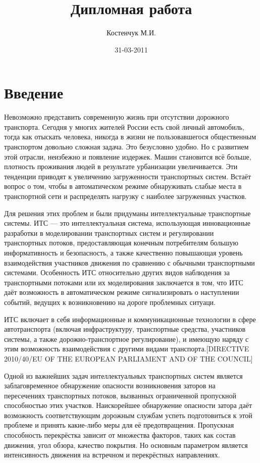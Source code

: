 \documentclass[a4paper,14pt]{article}
\title{Дипломная работа}
\author{Костенчук М.И.}
\date{31-03-2011}
\begin{document}
\maketitle

\tableofcontents
\newpage

\section{Введение}

Невозможно представить современную жизнь при отсутствии дорожного транспорта. Сегодня у многих жителей России есть свой личный автомобиль, тогда как отыскать человека, никогда в жизни не пользовавшегося общественным транспортом довольно сложная задача. Это безусловно удобно. Но с развитием этой отрасли, неизбежно и появление издержек. Машин становится всё больше, плотность проживания людей в результате урбанизации увеличивается. Эти тенденции приводят к увеличению загруженности транспортных систем. Встаёт вопрос о том, чтобы в автоматическом режиме обнаруживать слабые места в транспортной сети и распределять нагрузку с наиболее загруженных участков.

Для решения этих проблем и были придуманы интеллектуальные транспортные системы. ИТС — это интеллектуальная система, использующая инновационные разработки в моделировании транспортных систем и регулировании транспортных потоков, предоставляющая конечным потребителям большую информативность и безопасность, а также качественно повышающая уровень взаимодействия участников движения по сравнению с обычными транспортными системами. Особенность ИТС относительно других видов наблюдения за транспортными потоками или их моделирования заключается в том, что ИТС даёт возможность в автоматическом режиме сигнализировать о наступлении событий, ведущих к возникновению на дороге проблемных ситуаци.

ИТС включает в себя информационные и коммуникационные технологии в сфере автотранспорта (включая инфраструктуру, транспортные средства, участников системы, а также дорожно-транспортное регулирование), и имеющую наряду с этим возможность взаимодействия с другими видами транспорта.[DIRECTIVE 2010/40/EU OF THE EUROPEAN PARLIAMENT AND OF THE COUNCIL]

Одной из важнейших задач интеллектуальных транспортных систем является заблаговременное обнаружение опасности возникновения заторов на пересечениях транспортных потоков, вызванных ограниченной пропускной способностью этих участков. Наискорейшее обнаружение опасности затора даёт возможность соответствующим дорожным службам успеть подготовиться к этой проблеме и принять какие-либо меры для её предотвращения. Пропускная способность перекрёстка зависит от множества факторов, таких как состав движения, угол обзора, качество покрытия. Но основным параметром является интенсивность движения на встречном и перекрёстных направлениях.
\end{document}
